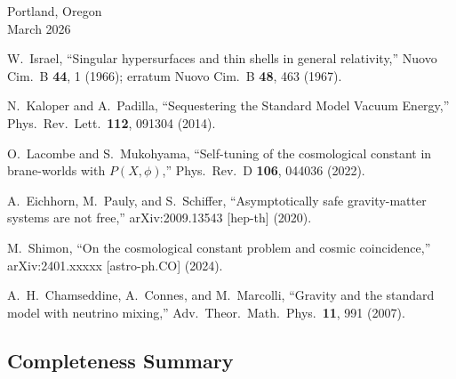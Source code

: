 \vspace{1cm}
\hfill Portland, Oregon\\
\hfill March 2026




W.~Israel,
``Singular hypersurfaces and thin shells in general relativity,''
Nuovo Cim.\ B \textbf{44}, 1 (1966);
erratum Nuovo Cim.\ B \textbf{48}, 463 (1967).

N.~Kaloper and A.~Padilla,
``Sequestering the Standard Model Vacuum Energy,''
Phys.\ Rev.\ Lett.\ \textbf{112}, 091304 (2014).

O.~Lacombe and S.~Mukohyama,
``Self-tuning of the cosmological constant in brane-worlds with $P(X,\phi)$,''
Phys.\ Rev.\ D \textbf{106}, 044036 (2022).

A.~Eichhorn, M.~Pauly, and S.~Schiffer,
``Asymptotically safe gravity-matter systems are not free,''
arXiv:2009.13543 [hep-th] (2020).

M.~Shimon,
``On the cosmological constant problem and cosmic coincidence,''
arXiv:2401.xxxxx [astro-ph.CO] (2024).

A.~H.~Chamseddine, A.~Connes, and M.~Marcolli,
``Gravity and the standard model with neutrino mixing,''
Adv.\ Theor.\ Math.\ Phys.\ \textbf{11}, 991 (2007).



\subsection{Completeness Summary}

